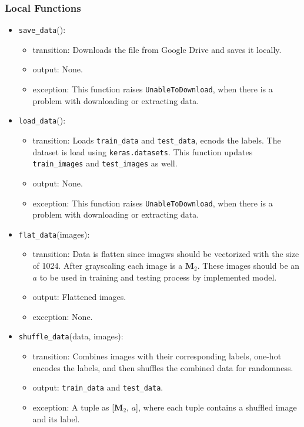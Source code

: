 \documentclass[12pt, titlepage]{article}
\def\code#1{\texttt{#1}}
\begin{document}
\subsubsection{Local Functions}
\begin{itemize}
  \item \code{save\_data}():
  \begin{itemize}
    \item transition: Downloads the file from Google Drive and saves it locally.
    \item output: None.
    \item exception: This function raises \code{UnableToDownload}, when there is 
    a problem with downloading or extracting data.
  \end{itemize}

  \item \code{load\_data}():
  \begin{itemize}
    \item transition: Loads \code{train\_data} and \code{test\_data}, ecnods the labels. 
    The dataset is load using \code{keras.datasets}.
    This function updates \code{train\_images} and \code{test\_images} as well. 
    \item output: None.
    \item exception: This function raises \code{UnableToDownload}, when there is 
    a problem with downloading or extracting data.
  \end{itemize}

  \item \code{flat\_data}(images):
  \begin{itemize}
    \item transition: Data is flatten since imagws should be vectorized with the size of 1024. 
    After grayscaling each image is a $\mathbf{M}_{2}$. These images should be an ${a}$ to be used in 
    training and testing process by implemented model.
    \item output: Flattened images.
    \item exception: None.
  \end{itemize}

  \item \code{shuffle\_data}(data, images):
  \begin{itemize}
    \item transition: Combines images with their corresponding labels, one-hot encodes the labels, 
    and then shuffles the combined data for randomness.
    \item output: \code{train\_data} and \code{test\_data}.
    \item exception: A tuple as [$\mathbf{M}_{2}$, ${a}$], 
    where each tuple contains a shuffled image and its label.
  \end{itemize}

\end{itemize}
\end{document}
